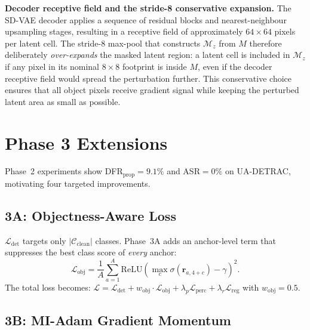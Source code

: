 \documentclass[12pt,a4paper]{report}
\newcommand{\Ldet}{\mathcal{L}_{\text{det}}}
\newcommand{\Lperc}{\mathcal{L}_{\text{perc}}}
\newcommand{\Lreg}{\mathcal{L}_{\text{reg}}}
\begin{document}
\textbf{Decoder receptive field and the stride-8 conservative expansion.}
The SD-VAE decoder applies a sequence of residual blocks and nearest-neighbour
upsampling stages, resulting in a receptive field of approximately
$64\times64$ pixels per latent cell.  The stride-8 max-pool that constructs
$\mathcal{M}_z$ from $M$ therefore deliberately \emph{over-expands} the
masked latent region: a latent cell is included in $\mathcal{M}_z$ if any
pixel in its nominal $8\times8$ footprint is inside $M$, even if the decoder
receptive field would spread the perturbation further.  This conservative
choice ensures that all object pixels receive gradient signal while keeping
the perturbed latent area as small as possible.

\section{Phase 3 Extensions}
\label{sec:phase3}



Phase~2 experiments show DFR$_{\text{prop}} = 9.1\%$ and ASR$= 0\%$ on UA-DETRAC,
motivating four targeted improvements.

\subsection{3A: Objectness-Aware Loss}
\label{sec:3a}

$\Ldet$ targets only $|\mathcal{C}_{\text{clean}}|$ classes. Phase~3A adds an anchor-level term
that suppresses the best class score of \emph{every} anchor:
\begin{equation}
  \mathcal{L}_{\text{obj}} = \frac{1}{A}
    \sum_{a=1}^{A} \mathrm{ReLU}\!\left(\max_{c} \sigma(\mathbf{r}_{a, 4+c}) - \gamma\right)^2.
  \label{eq:lobj}
\end{equation}
The total loss becomes:
$\mathcal{L} = \Ldet + w_{\text{obj}} \cdot \mathcal{L}_{\text{obj}} + \lambda_p \Lperc + \lambda_r \Lreg$
with $w_{\text{obj}} = 0.5$.

\subsection{3B: MI-Adam Gradient Momentum}
\label{sec:3b}
\end{document}
